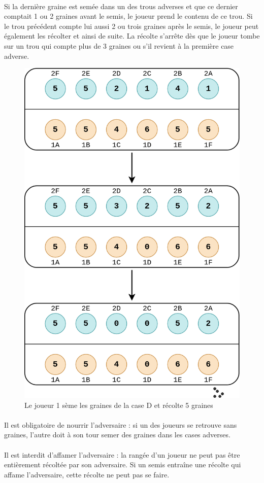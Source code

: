 \documentclass{article}
\begin{document}
    \paragraph{}
    Si la dernière graine est semée dans un des trous adverses et que ce dernier comptait 1 ou 2 graines avant le semis, le joueur prend le contenu de ce trou. Si le trou précédent compte lui aussi 2 ou trois graines après le semis, le joueur peut également les récolter et ainsi de suite. La récolte s'arrête dès que le joueur tombe sur un trou qui compte plus de 3 graines ou s'il revient à la première case adverse.

    \begin{figure}[H]
        \centering
        \includegraphics[width=.55\linewidth]{./images/recolte1.png}
        \caption{Le joueur 1 sème les graines de la case D et récolte 5 graines}
    \end{figure}
    
    \paragraph{}
    Il est obligatoire de nourrir l'adversaire : si un des joueurs se retrouve sans graines, l'autre doit à son tour semer des graines dans les cases adverses.

    \paragraph{}
    Il est interdit d'affamer l'adversaire : la rangée d'un joueur ne peut pas être entièrement récoltée par son adversaire. Si un semis entraîne une récolte qui affame l'adversaire, cette récolte ne peut pas se faire.
\end{document}
